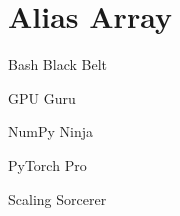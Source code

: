\section*{Alias Array}

\begin{itemizeMain}
    \item[\blackbelt] Bash Black Belt
    \item[\meditate] GPU Guru
    \item[\faUserNinja] NumPy Ninja
    \item[\faUserTie] PyTorch Pro
    \item[\faMagic] Scaling Sorcerer
\end{itemizeMain}
